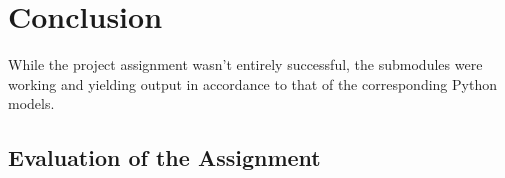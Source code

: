 \chapter{Conclusion}
While the project assignment wasn't entirely successful, the submodules were working and yielding output in accordance to that of the corresponding Python models.

\section{Evaluation of the Assignment}

